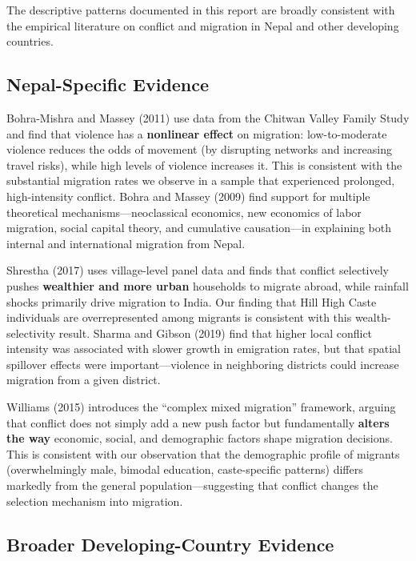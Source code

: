 \documentclass[12pt,letterpaper]{article}
\begin{document}
The descriptive patterns documented in this report are broadly consistent with the empirical literature on conflict and migration in Nepal and other developing countries.

\subsection{Nepal-Specific Evidence}

Bohra-Mishra and Massey (2011) use data from the Chitwan Valley Family Study and find that violence has a \textbf{nonlinear effect} on migration: low-to-moderate violence reduces the odds of movement (by disrupting networks and increasing travel risks), while high levels of violence increases it. This is consistent with the substantial migration rates we observe in a sample that experienced prolonged, high-intensity conflict. Bohra and Massey (2009) find support for multiple theoretical mechanisms---neoclassical economics, new economics of labor migration, social capital theory, and cumulative causation---in explaining both internal and international migration from Nepal.

Shrestha (2017) uses village-level panel data and finds that conflict selectively pushes \textbf{wealthier and more urban} households to migrate abroad, while rainfall shocks primarily drive migration to India. Our finding that Hill High Caste individuals are overrepresented among migrants is consistent with this wealth-selectivity result. Sharma and Gibson (2019) find that higher local conflict intensity was associated with slower growth in emigration rates, but that spatial spillover effects were important---violence in neighboring districts could increase migration from a given district.

Williams (2015) introduces the ``complex mixed migration'' framework, arguing that conflict does not simply add a new push factor but fundamentally \textbf{alters the way} economic, social, and demographic factors shape migration decisions. This is consistent with our observation that the demographic profile of migrants (overwhelmingly male, bimodal education, caste-specific patterns) differs markedly from the general population---suggesting that conflict changes the selection mechanism into migration.

\subsection{Broader Developing-Country Evidence}
\end{document}
